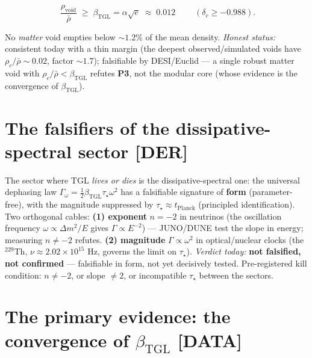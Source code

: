 \documentclass[11pt]{article}
\newcommand{\bTGL}{\beta_{\mathrm{TGL}}}\newcommand{\Msun}{M_{\odot}}\newcommand{\TGL}{\mathrm{TGL}}
\theoremstyle{definition}\newtheorem{deriv}{Derivation}
\begin{document}
\begin{equation}\boxed{\;\frac{\rho_{\mathrm{void}}}{\bar\rho}\;\geq\;\bTGL=\alpha\sqrt{e}\;\approx\;0.012\;}\qquad(\delta_c\geq-0.988).\end{equation}

No \emph{matter} void empties below $\sim1.2\%$ of the mean density. \emph{Honest status:} consistent today with a thin margin (the deepest observed/simulated voids have $\rho_c/\bar\rho\sim0.02$, factor $\sim1.7$); falsifiable by DESI/Euclid --- a single robust matter void with $\rho_c/\bar\rho<\bTGL$ refutes \textbf{P3}, not the modular core (whose evidence is the convergence of $\bTGL$).

\section{The falsifiers of the dissipative-spectral sector \textsf{[DER]}}

The sector where TGL \emph{lives or dies} is the dissipative-spectral one: the universal dephasing law $\Gamma_\omega=\tfrac12\bTGL\tau_\star\omega^2$ has a falsifiable signature of \textbf{form} (parameter-free), with the magnitude suppressed by $\tau_\star\approx t_{\mathrm{Planck}}$ (principled identification). Two orthogonal cables: \textbf{(1) exponent} $n=-2$ in neutrinos (the oscillation frequency $\omega\propto\Delta m^2/E$ gives $\Gamma\propto E^{-2}$) --- JUNO/DUNE test the slope in energy; measuring $n\neq-2$ refutes. \textbf{(2) magnitude} $\Gamma\propto\omega^2$ in optical/nuclear clocks (the $^{229}$Th, $\nu\approx2.02\times10^{15}$ Hz, governs the limit on $\tau_\star$). \emph{Verdict today:} \textbf{not falsified, not confirmed} --- falsifiable in form, not yet decisively tested. Pre-registered kill condition: $n\neq-2$, or slope $\neq2$, or incompatible $\tau_\star$ between the sectors.

\section{The primary evidence: the convergence of $\bTGL$ \textsf{[DATA]}}
\end{document}
